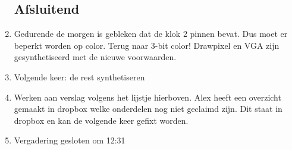 \documentclass{article}
\begin{document}
\begin{enumerate}
\begin{itemize}
	\end{itemize}

	\noindent 
	\subsection*{Afsluitend}
	\item Gedurende de morgen is gebleken dat de klok 2 pinnen bevat. Dus moet er beperkt worden op color. Terug naar 3-bit color! Drawpixel en VGA 		zijn gesynthetiseerd met de nieuwe voorwaarden. 
	\item Volgende keer: de rest  synthetiseren 
	\item Werken aan verslag volgens het lijstje hierboven. Alex heeft een overzicht gemaakt in dropbox welke onderdelen nog niet geclaimd zijn. Dit 		staat in dropbox en kan de volgende keer gefixt worden. 
	\item Vergadering gesloten om 12:31 %

\end{enumerate}
\end{document}
